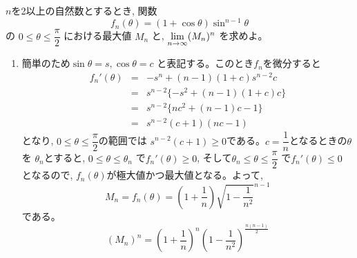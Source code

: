 $n$を2以上の自然数とするとき, 関数
\[f_n(\theta )= (1+\cos{\theta})\sin^{n-1}{\theta}\]
の $0\leq \theta\leq \dfrac{\pi}{2}$ における最大値 $M_n$ と, $\displaystyle\lim_{n\to \infty} (M_n)^n$ を求めよ。
\enthm
\begin{enumerate}
\item[]簡単のため$\sin{\theta}=s, \cos{\theta}=c$ と表記する。このとき$f_n$を微分すると
\begin{eqnarray*}
f_n'(\theta)&=& -s^n + (n-1)(1+c)s^{n-2}c\\
&=&s^{n-2}\{-s^2 +(n-1)(1+c)c\}\\
&=&s^{n-2}\{nc^2 +(n-1)c -1\}\\
&=&s^{n-2}(c+1)(nc-1)
\end{eqnarray*}
となり, $0\leq \theta\leq \dfrac{\pi}{2}$の範囲では $s^{n-2}(c+1)\geq 0$である。$c=\dfrac{1}{n}$となるときの$\theta$ を $\theta_n$とすると, $0\leq \theta\leq \theta_n$ で$f_n'(\theta)\geq 0$, そして$\theta_n\leq \theta\leq \dfrac{\pi}{2} $ で$f_n'(\theta)\leq 0$ となるので, $f_n(\theta)$が極大値かつ最大値となる。よって,
\[M_n=f_n(\theta)=\left(1+\dfrac{1}{n}\right)\sqrt{1-\dfrac{1}{n^2}}^{n-1}\]
である。
\[(M_n)^n=\left(1+\dfrac{1}{n}\right)^n\left(1-\dfrac{1}{n^2}\right)^{\frac{n(n-1)}{2}}\]

\end{enumerate}
